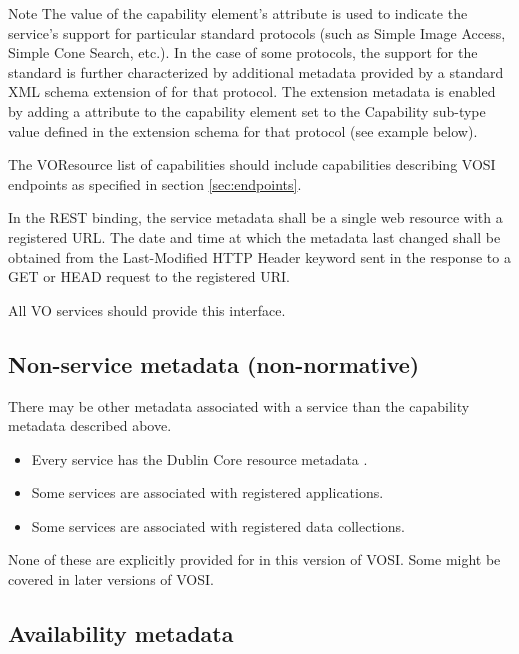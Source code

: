 \documentclass[11pt,letter]{ivoa}
\begin{document}
\begin{admonition}{Note}
The value of the capability element's  attribute is used to indicate the service's support for particular standard protocols (such as Simple Image Access, Simple Cone Search, etc.). In the case of some protocols, the support for the standard is further characterized by additional metadata provided by a standard XML schema extension of  for that protocol. The extension metadata is enabled by adding a  attribute to the capability element set to the Capability sub-type value defined in the extension schema for that protocol (see example below). 
    
The VOResource list of capabilities should include capabilities describing VOSI endpoints as specified in section \ref{sec:endpoints}.
\end{admonition}

In the REST binding, the service metadata shall be a single web resource with a registered URL. The date and time at which the metadata last changed shall be obtained from the Last-Modified HTTP Header keyword sent in the response to a GET or HEAD request to the registered URI.

All VO services should provide this interface. 

\subsection{Non-service metadata (non-normative)}

There may be other metadata associated with a service than the capability metadata described above.

\begin{itemize}
\item Every service has the Dublin Core resource metadata \citep{std:DUBLINCORE}.
\item Some services are associated with registered applications.
\item Some services are associated with registered data collections. 
\end{itemize}

None of these are explicitly provided for in this version of VOSI. Some might be covered in later versions of VOSI. 

\subsection{Availability metadata}
\end{document}
